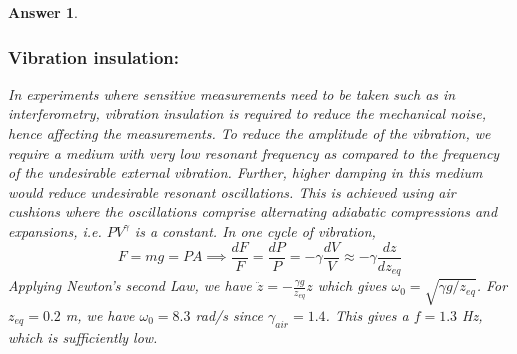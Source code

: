 \documentclass[a4paper]{article}
\newtheorem{ans}{Answer}[section]
\theoremstyle{new}
\begin{document}
\newpage
\begin{ans}\leavevmode
\subsubsection*{Vibration insulation:} 
In experiments where sensitive measurements need to be taken such as in interferometry, vibration insulation is required to reduce the mechanical noise, hence affecting the measurements. To reduce the amplitude of the vibration, we require a medium with very low resonant frequency as compared to the frequency of the undesirable external vibration. Further, higher damping in this medium would reduce undesirable resonant oscillations. This is achieved using air cushions where the oscillations comprise alternating adiabatic compressions and expansions, i.e. $PV^\gamma$ is a constant. In one cycle of vibration,
$$F=mg=PA\implies\frac{dF}{F}=\frac{dP}{P}=-\gamma\frac{dV}{V}\approx-\gamma\frac{dz}{dz_{eq}}$$
Applying Newton's second Law, we have $\ddot{z}=-\frac{\gamma g}{z_{eq}}z$ which gives $\omega_0=\sqrt{\gamma g/z_{eq}}$. For $z_{eq}=0.2$ m, we have $\omega_0=8.3$ rad/s since $\gamma_{air}=1.4$. This gives a $f=1.3$ Hz, which is sufficiently low.

\end{ans}
\end{document}
